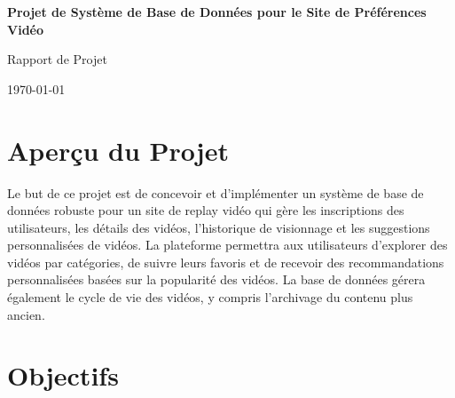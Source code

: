 \documentclass[a4paper,12pt]{article}
\begin{document}
\begin{titlepage}
    \centering
    \vspace*{5cm}
    {\Huge\bfseries Projet de Système de Base de Données pour le Site de Préférences Vidéo\par}
    \vspace{1cm}
    {\Large Rapport de Projet\par}
    \vspace{2cm}
    {\large \today\par}
    \vfill
\end{titlepage}

\tableofcontents
\newpage

\section{Aperçu du Projet}

Le but de ce projet est de concevoir et d'implémenter un système de base de données robuste pour un site de replay vidéo qui gère les inscriptions des utilisateurs, les détails des vidéos, l'historique de visionnage et les suggestions personnalisées de vidéos. La plateforme permettra aux utilisateurs d'explorer des vidéos par catégories, de suivre leurs favoris et de recevoir des recommandations personnalisées basées sur la popularité des vidéos. La base de données gérera également le cycle de vie des vidéos, y compris l'archivage du contenu plus ancien.

\section{Objectifs}
\end{document}
